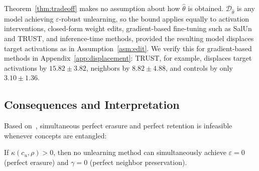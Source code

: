 \begin{remark}\label{rem:scope}
Theorem~\ref{thm:tradeoff} makes no assumption about how $\hat\theta$ is
obtained. $\mathcal{D}_{\hat\theta}$ is any model achieving $\varepsilon$-robust
unlearning, so the bound applies equally to activation interventions,
closed-form weight edits, gradient-based fine-tuning such as SalUn and TRUST,
and inference-time methods, provided the resulting model displaces target
activations as in Assumption~\ref{asm:edit}. We verify this for
gradient-based methods in Appendix~\ref{app:displacement}: TRUST, for example,
displaces target activations by $15.82\pm3.82$, neighbors by $8.82\pm4.88$, and
controls by only $3.10\pm1.36$.
\end{remark}

\subsection{Consequences and Interpretation}
\label{subsec:consequences}

Based on~, simultaneous perfect erasure and perfect retention is infeasible whenever concepts are entangled:
\begin{corollary}
\label{cor:impossibility}
If $\kappa(c_u,\rho) > 0$,
then no unlearning method can simultaneously achieve $\varepsilon = 0$ (perfect erasure) and $\gamma = 0$ (perfect neighbor preservation).
\end{corollary}

